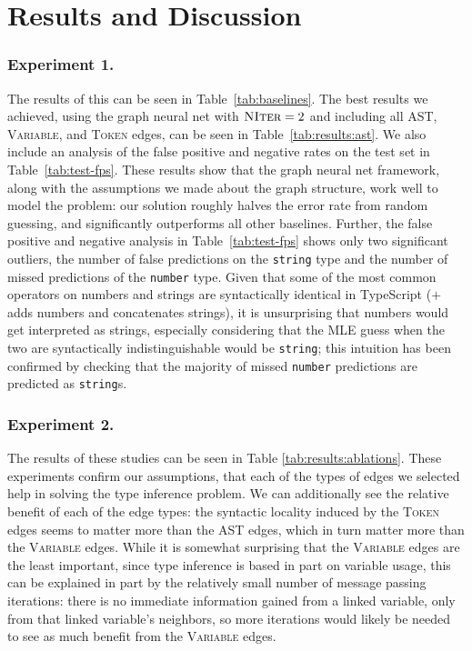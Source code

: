 \section{Results and Discussion}
\label{sec:results}
\subsubsection{Experiment 1.}
The results of this can be seen in Table~\ref{tab:baselines}.
The best results we achieved, using the graph neural net with $\textsc{NIter}=2$ and including all AST, \textsc{Variable}, and \textsc{Token} edges, can be seen in Table~\ref{tab:results:ast}.
We also include an analysis of the false positive and negative rates on the test set in Table~\ref{tab:test-fps}.
These results show that the graph neural net framework, along with the assumptions we made about the graph structure, work well to model the problem: our solution roughly halves the error rate from random guessing, and significantly outperforms all other baselines.
Further, the false positive and negative analysis in Table~\ref{tab:test-fps} shows only two significant outliers, the number of false predictions on the \texttt{string} type and the number of missed predictions of the \texttt{number} type.
Given that some of the most common operators on numbers and strings are syntactically identical in TypeScript ($+$ adds numbers and concatenates strings), it is unsurprising that numbers would get interpreted as strings, especially considering that the MLE guess when the two are syntactically indistinguishable would be \texttt{string}; this intuition has been confirmed by checking that the majority of missed \texttt{number} predictions are predicted as \texttt{string}s.

\subsubsection{Experiment 2.} The results of these studies can be seen in Table \ref{tab:results:ablations}.
These experiments confirm our assumptions, that each of the types of edges we selected help in solving the type inference problem.
We can additionally see the relative benefit of each of the edge types: the syntactic locality induced by the \textsc{Token} edges seems to matter more than the AST edges, which in turn matter more than the \textsc{Variable} edges.
While it is somewhat surprising that the \textsc{Variable} edges are the least important, since type inference is based in part on variable usage, this can be explained in part by the relatively small number of message passing iterations: there is no immediate information gained from a linked variable, only from that linked variable's neighbors, so more iterations would likely be needed to see as much benefit from the \textsc{Variable} edges.

